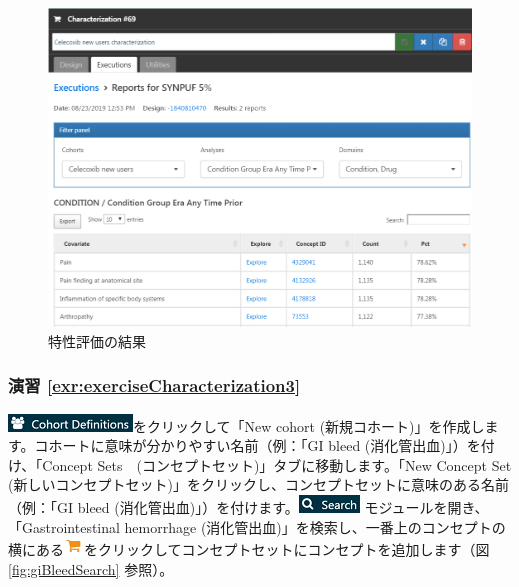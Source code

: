 \documentclass[
  11pt]{book}
\theoremstyle{definition}
\theoremstyle{definition}
\theoremstyle{definition}
\theoremstyle{definition}
\theoremstyle{remark}
\begin{document}
\begin{figure}

{\centering \includegraphics[width=1\linewidth]{images/SuggestedAnswers/celecoxibCharacterizationResults} 

}

\caption{特性評価の結果}\label{fig:celecoxibCharacterizationResults}
\end{figure}

\subsubsection*{演習 \ref{exr:exerciseCharacterization3}}\label{ux6f14ux7fd2-refexrexercisecharacterization3}

\includegraphics{images/Cohorts/cohortdefinition.png}をクリックして「New cohort (新規コホート)」を作成します。コホートに意味が分かりやすい名前（例：「GI bleed (消化管出血)」）を付け、「Concept Sets　(コンセプトセット)」タブに移動します。「New Concept Set (新しいコンセプトセット)」をクリックし、コンセプトセットに意味のある名前（例：「GI bleed (消化管出血)」）を付けます。\includegraphics{images/Cohorts/search-2.png} モジュールを開き、「Gastrointestinal hemorrhage (消化管出血)」を検索し、一番上のコンセプトの横にある\includegraphics{images/Cohorts/shoppingcart.png}をクリックしてコンセプトセットにコンセプトを追加します（図 \ref{fig:giBleedSearch} 参照）。
\end{document}
